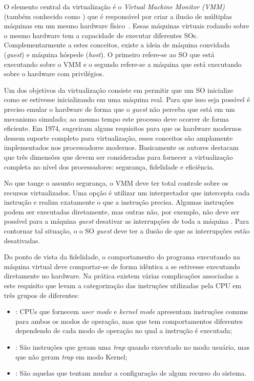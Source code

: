 O elemento central da virtualização é o \emph{Virtual Machine Monitor (VMM)}
(também conhecido como ) que é responsável por criar a
ilusão de múltiplas máquinas em um mesmo hardware físico~\citep{tanenbaum}.
Essas máquinas virtuais rodando sobre o mesmo hardware tem a capacidade de
executar diferentes SOs. Complementarmente a estes conceitos, existe a ideia de
máquina convidada (\emph{guest}) e máquina hóspede (\emph{host}). O primeiro
refere-se ao SO que está executando sobre o VMM e o segundo refere-se a máquina
que está executando sobre o hardware com privilégios.

Um dos objetivos da virtualização consiste em permitir que um SO inicialize
como se estivesse inicializando em uma máquina real. Para que isso seja
possível é preciso emular o hardware de forma que o \emph{guest} não perceba
que está em um mecanismo simulado; ao mesmo tempo este processo deve ocorrer de
forma eficiente. Em 1974, \cite{popek} sugeriram alguns requisitos para que os
hardware modernos dessem suporte completo para virtualização, esses conceitos
são amplamente implementados nos processadores modernos. Basicamente os autores
destacam que três dimensões que devem ser consideradas para fornecer a
virtualização completa no nível dos processadores: segurança, fidelidade e
eficiência.

No que tange o assunto segurança, o VMM deve ter total controle sobre os
recursos virtualizados. Uma opção é utilizar um interpretador que intercepta
cada instrução e realiza exatamente o que a instrução precisa. Algumas
instruções podem ser executadas diretamente, mas outras não, por exemplo, não
deve ser possível para a máquina \emph{guest} desativar as interrupções de toda
a máquina \citep{tanenbaum}. Para contornar tal situação, o o SO \emph{guest}
deve ter a ilusão de que as interrupções estão desativadas.

Do ponto de vista da fidelidade, o comportamento do programa executando na
máquina virtual deve comportar-se de forma idêntica a se estivesse executando
diretamente no hardware. Na prática existem várias complicações associadas a
este requisito que levam a categorização das instruções utilizadas pela CPU em
três grupos de diferentes:

\begin{itemize}
  \item {}: CPUs que fornecem \emph{user mode} e
        \emph{kernel mode} apresentam instruções comuns para ambos os modos de
        operação, mas que tem comportamentos diferentes dependendo de cada modo
        de operação no qual a instrução é executada;
  \item {}: São instruções que geram uma
        \emph{trap} quando executado no modo usuário, mas que não geram
        \emph{trap} em modo Kernel;
  \item {}: São aquelas que
        tentam mudar a configuração de algum recurso do sistema.
\end{itemize}

